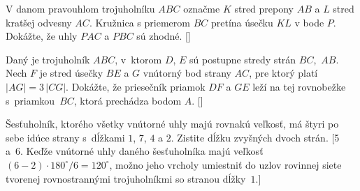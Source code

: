 {\D
V danom pravouhlom trojuholníku $ABC$ označme $K$ stred prepony $AB$ a $L$ stred kratšej odvesny $AC$. Kružnica s priemerom $BC$ pretína úsečku $KL$ v bode $P$. Dokážte, že uhly $PAC$ a $PBC$ sú zhodné. []

Daný je trojuholník $ABC$, v~ktorom $D$, $E$ sú postupne stredy
strán $BC$,~$AB$. Nech $F$ je stred úsečky $BE$
a $G$ vnútorný bod strany $AC$, pre ktorý platí $|AG|=3\,|CG|$.
Dokážte, že priesečník priamok $DF$ a $GE$ leží na tej rovnobežke
s~priamkou~$BC$, ktorá prechádza bodom $A$. []

Šesťuholník, ktorého všetky vnútorné uhly majú rovnakú
veľkosť, má štyri po sebe idúce strany s~dĺžkami $1$, $7$, $4$
a $2$. Zistite dĺžku zvyšných dvoch strán.
[5 a~6. Keďže vnútorné uhly daného šesťuholníka majú
veľkosť $(6-2)\cdot180^{\circ}/6=120^{\circ}$, možno jeho vrcholy
umiestniť do uzlov rovinnej siete tvorenej rovnostrannými trojuholníkmi so stranou
dĺžky~$1$.]

}

